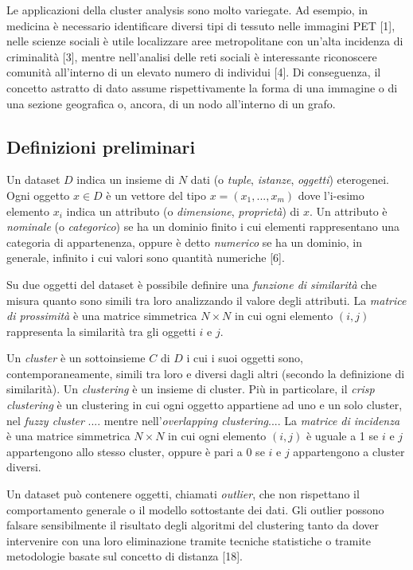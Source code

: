 Le applicazioni della cluster analysis sono molto variegate. Ad esempio, in medicina \`e necessario identificare diversi tipi di tessuto nelle immagini PET [1], nelle scienze sociali \`e utile localizzare aree metropolitane con un'alta incidenza di criminalit\`a [3], mentre nell'analisi delle reti sociali \`e interessante riconoscere comunit\`a all'interno di un elevato numero di individui [4]. Di conseguenza, il concetto astratto di dato assume rispettivamente la forma di una immagine o di una sezione geografica o, ancora, di un nodo all'interno di un grafo.

\subsection{Definizioni preliminari}
Un dataset $ D $ indica un insieme di $ N $ dati (o \textit{tuple}, \textit{istanze}, \textit{oggetti}) eterogenei. Ogni oggetto $ x \in D $ \`e un vettore del tipo $ x = (x_{1},..., x_{m}) $ dove l'i-esimo elemento $ x_{i} $ indica un attributo (o \textit{dimensione}, \textit{propriet\`a}) di $ x $. Un attributo \`e \textit{nominale} (o \textit{categorico}) se ha un dominio finito i cui elementi rappresentano una categoria di appartenenza, oppure \`e detto \textit{numerico} se ha un dominio, in generale, infinito i cui valori sono quantit\`a numeriche [6].

Su due oggetti del dataset \`e possibile definire una \textit{funzione di similarit\`a} che misura quanto sono simili tra loro analizzando il valore degli attributi. La \textit{matrice di prossimit\`a} \`e una matrice simmetrica $ N \times N $ in cui ogni elemento $ (i,j) $ rappresenta la similarit\`a tra gli oggetti $ i $ e $ j $.

Un \textit{cluster} \`e un sottoinsieme $ C $ di $ D $ i cui i suoi oggetti sono, contemporaneamente, simili tra loro e diversi dagli altri (secondo la definizione di similarit\`a). Un \textit{clustering} \`e un insieme di cluster. Pi\`u in particolare, il \textit{crisp clustering} \`e un clustering in cui ogni oggetto appartiene ad uno e un solo cluster, nel \textit{fuzzy cluster} .... mentre nell'\textit{overlapping clustering}....
La \textit{matrice di incidenza} \`e una matrice simmetrica $ N \times N $ in cui ogni elemento $ (i, j) $ \`e uguale a 1 se $ i $ e $ j $ appartengono allo stesso cluster, oppure \`e pari a 0 se $ i $ e $ j $ appartengono a cluster diversi.

Un dataset pu\`o contenere oggetti, chiamati \textit{outlier}, che non rispettano il comportamento generale o il modello sottostante dei dati. Gli outlier possono falsare sensibilmente il risultato degli algoritmi del clustering tanto da dover intervenire con una loro eliminazione tramite tecniche statistiche o tramite metodologie basate sul concetto di distanza [18].

